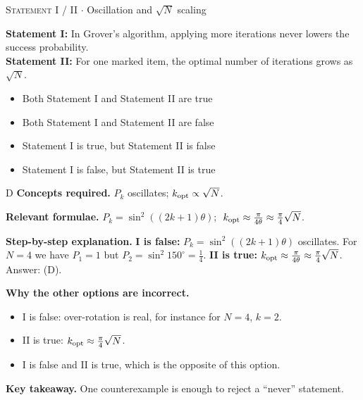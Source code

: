 \documentclass[11pt,a4paper]{article}
\newcommand{\optlabel}[1]{\textbf{(#1)}}
\newcommand{\correctlabel}[1]{\textcolor{okgreen}{\textbf{(#1)}\,\ding{51}}}
\newenvironment{qitem}[1]{\begin{list}{}{\setlength{\leftmargin}{3.3em}\setlength{\labelwidth}{3.1em}%
  \setlength{\labelsep}{0.2em}\setlength{\topsep}{3pt}\setlength{\parsep}{3pt}}\item[\textbf{Q.#1}\hfill]}{\end{list}}
\newcommand{\qsep}{\par\vspace{2pt}{\color{black!15}\hrule}\vspace{4pt}}
\newcommand{\qmeta}[2]{{\footnotesize\color{black!60}\textsc{#1} \;$\cdot$\; #2}\par}
\begin{document}
\begin{qitem}{58}
\qmeta{Statement I / II}{Oscillation and $\sqrt N$ scaling}
\textbf{Statement I:} In Grover's algorithm, applying more iterations never lowers the success probability.\\[1mm]
\textbf{Statement II:} For one marked item, the optimal number of iterations grows as $\sqrt N$.
\begin{itemize}[leftmargin=2.6em, labelsep=0.4em, itemsep=2pt, topsep=3pt]
\item[\optlabel{A}] Both Statement I and Statement II are true
\item[\optlabel{B}] Both Statement I and Statement II are false
\item[\optlabel{C}] Statement I is true, but Statement II is false
\item[\correctlabel{D}] Statement I is false, but Statement II is true
\end{itemize}
\end{qitem}
\begin{solbox}{D}
\textbf{\color{brand}Concepts required.} $P_k$ oscillates; $k_{\rm opt} \propto \sqrt N$.

\textbf{\color{brand}Relevant formulae.} $P_k = \sin^2((2k+1)\theta)$; $\;k_{\rm opt} \approx \frac{\pi}{4\theta} \approx \frac\pi4\sqrt N$.

\textbf{\color{brand}Step-by-step explanation.} \textbf{I is false:} $P_k = \sin^2((2k+1)\theta)$ oscillates. For $N = 4$ we have $P_1 = 1$ but $P_2 = \sin^2 150^\circ = \frac14$.
\textbf{II is true:} $k_{\rm opt} \approx \frac{\pi}{4\theta} \approx \frac\pi4\sqrt N$. Answer: (D).

\textbf{\color{brand}Why the other options are incorrect.}
\begin{itemize}[leftmargin=2.4em, itemsep=1pt, topsep=2pt]
\item[\textbf{(A)}] I is false: over-rotation is real, for instance for $N = 4$, $k = 2$.
\item[\textbf{(B)}] II is true: $k_{\rm opt} \approx \frac\pi4\sqrt N$.
\item[\textbf{(C)}] I is false and II is true, which is the opposite of this option.
\end{itemize}
\textbf{\color{brand}Key takeaway.} One counterexample is enough to reject a ``never'' statement.
\end{solbox}
\qsep
\end{document}
